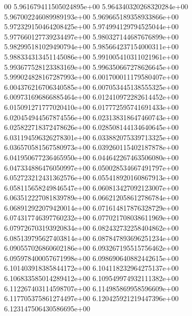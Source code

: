 00	5.961679411505024895e+00	5.964340320268320284e+00	5.967002246089989193e+00	5.969665189358933866e+00	5.972329150464208425e+00	5.974994129794525044e+00	5.977660127739234497e+00	5.980327144687676899e+00	5.982995181029490794e+00	5.985664237154000311e+00	5.988334313451145086e+00	5.991005410311021961e+00	5.993677528123383169e+00	5.996350667278626645e+00	5.999024828167287993e+00	6.001700011179580407e+00	6.004376216706340585e+00	6.007053445138555325e+00	6.009731696866885464e+00	6.012410972282614452e+00	6.015091271777020410e+00	6.017772595741691433e+00	6.020454944567874556e+00	6.023138318647460743e+00	6.025822718372478626e+00	6.028508144134640645e+00	6.031194596326278301e+00	6.033882075339713325e+00	6.036570581567580973e+00	6.039260115402187878e+00	6.041950677236465950e+00	6.044642267463506080e+00	6.047334886476050997e+00	6.050028534667491797e+00	6.052723212431362576e+00	6.055418920160867913e+00	6.058115658249846547e+00	6.060813427092123007e+00	6.063512227081839789e+00	6.066212058612786784e+00	6.068912922079420014e+00	6.071614817876328729e+00	6.074317746397760232e+00	6.077021708038611969e+00	6.079726703193920834e+00	6.082432732258404862e+00	6.085139795627403814e+00	6.087847893696251234e+00	6.090557026860602186e+00	6.093267195515756462e+00	6.095978400057671998e+00	6.098690640882442615e+00	6.101403918385844172e+00	6.104118232964275137e+00	6.106833585014289412e+00	6.109549974932111382e+00	6.112267403114598707e+00	6.114985869958596609e+00	6.117705375861274497e+00	6.120425921219447396e+00	6.123147506430586695e+00
